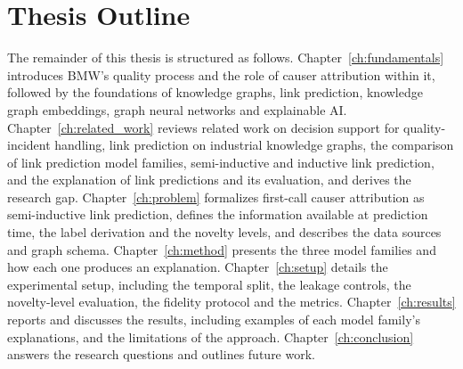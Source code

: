 \section{Thesis Outline}\label{sec:intro_outline}

The remainder of this thesis is structured as follows.
Chapter~\ref{ch:fundamentals} introduces BMW's quality process and the role
of causer attribution within it, followed by the foundations of knowledge
graphs, link prediction, knowledge graph embeddings, graph neural networks
and explainable AI.
Chapter~\ref{ch:related_work} reviews related work on decision support for
quality-incident handling, link prediction on industrial knowledge graphs,
the comparison of link prediction model families, semi-inductive and
inductive link prediction, and the explanation of link predictions and its
evaluation, and derives the research gap.
Chapter~\ref{ch:problem} formalizes first-call causer attribution as
semi-inductive link prediction, defines the information available at
prediction time, the label derivation and the novelty levels, and describes
the data sources and graph schema.
Chapter~\ref{ch:method} presents the three model families and how each one
produces an explanation.
Chapter~\ref{ch:setup} details the experimental setup, including the
temporal split, the leakage controls, the novelty-level evaluation, the
fidelity protocol and the metrics.
Chapter~\ref{ch:results} reports and discusses the results, including
examples of each model family's explanations, and the limitations of the
approach.
Chapter~\ref{ch:conclusion} answers the research questions and outlines
future work.
